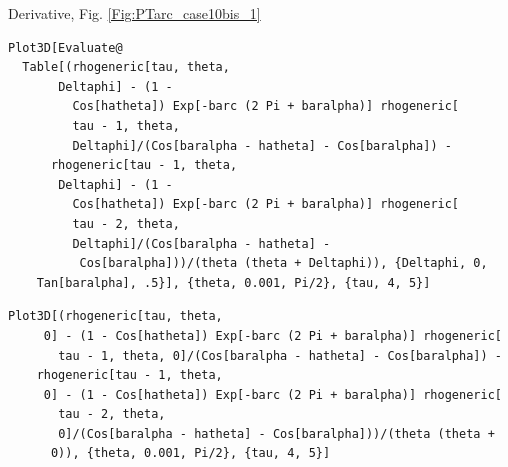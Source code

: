 \documentclass[reqno]{amsart}
\theoremstyle{definition} \newtheorem{definition}{Definition}[section]
\theoremstyle{definition} \newtheorem{remark}[definition]{Remark}
\theoremstyle{plain} \newtheorem{lemma}[definition]{Lemma}
\theoremstyle{plain} \newtheorem{proposition}[definition]{Proposition}
\theoremstyle{plain} \newtheorem{theorem}[definition]{Theorem}
\theoremstyle{plain} \newtheorem{corollary}[definition]{Corollary}
\theoremstyle{definition} \newtheorem{example}[definition]{Example}
\theoremstyle{plain} \newtheorem{claim}[clai]{Claim}
\theoremstyle{definition} \newtheorem{assumption}[definition]{Assumption}
\theoremstyle{definition} \newtheorem{observation}[definition]{Observation}
\newcommand{\1}{\mathbbm 1}
\newcommand{\smed}{\medskip}
\numberwithin{equation}{section} %
\theoremstyle{plain} \newtheorem*{theorem*}{Theorem}
\theoremstyle{plain} \newtheorem{mthm}[maintheorem]{Main Theorem}
\theoremstyle{plain} \newtheorem*{mthm*}{Main Theorem}
\theoremstyle{plain} \newtheorem*{conjecture*}{Conjecture}
\theoremstyle{plain} \newtheorem{conjecture}[definition]{Conjecture}
\theoremstyle{plain} \newtheorem*{problem*}{Problem}
\begin{document}
\smed
Derivative, Fig. \ref{Fig:PTarc_case10bis_1}
\smed
\begin{verbatim}
Plot3D[Evaluate@
  Table[(rhogeneric[tau, theta, 
       Deltaphi] - (1 - 
         Cos[hatheta]) Exp[-barc (2 Pi + baralpha)] rhogeneric[
         tau - 1, theta, 
         Deltaphi]/(Cos[baralpha - hatheta] - Cos[baralpha]) - 
      rhogeneric[tau - 1, theta, 
       Deltaphi] - (1 - 
         Cos[hatheta]) Exp[-barc (2 Pi + baralpha)] rhogeneric[
         tau - 2, theta, 
         Deltaphi]/(Cos[baralpha - hatheta] - 
          Cos[baralpha]))/(theta (theta + Deltaphi)), {Deltaphi, 0, 
    Tan[baralpha], .5}], {theta, 0.001, Pi/2}, {tau, 4, 5}]
\end{verbatim}
\begin{verbatim}
Plot3D[(rhogeneric[tau, theta, 
     0] - (1 - Cos[hatheta]) Exp[-barc (2 Pi + baralpha)] rhogeneric[
       tau - 1, theta, 0]/(Cos[baralpha - hatheta] - Cos[baralpha]) - 
    rhogeneric[tau - 1, theta, 
     0] - (1 - Cos[hatheta]) Exp[-barc (2 Pi + baralpha)] rhogeneric[
       tau - 2, theta, 
       0]/(Cos[baralpha - hatheta] - Cos[baralpha]))/(theta (theta + 
      0)), {theta, 0.001, Pi/2}, {tau, 4, 5}]
\end{verbatim}
\end{document}
